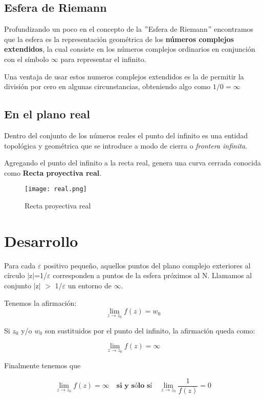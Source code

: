 \documentclass[12p]{article}
\begin{document}
\subsection{Esfera de Riemann}
Profundizando un poco en el concepto de la $"$Esfera de Riemann$"$ encontramos que la esfera es la representación geométrica de los \textbf{números complejos extendidos}, la cual consiste en los números complejos ordinarios en conjunción con el símbolo $\infty$ para representar el infinito.

Una ventaja de usar estos numeros complejos extendidos es la de permitir la división por cero en algunas circunstancias, obteniendo algo como $1/0=\infty$

\subsection{En el plano real}
Dentro del conjunto de los números reales el punto del infinito es una entidad topológica y geométrica que se introduce a modo de cierra o \textit{frontera infinita}.

Agregando el punto del infinito a la recta real, genera una curva cerrada conocida como \textbf{Recta proyectiva real}.

\begin{figure}[h]
\begin{center}
\texttt{[image: real.png]}\\
\caption{Recta proyectiva real}
\label{fig:figura2}
\end{center}
\end{figure}

\section{Desarrollo}
Para cada $\varepsilon$ positivo pequeño, aquellos puntos del plano complejo exteriores al círculo $|$z$|$=1/$\varepsilon$ corresponden a puntos de la esfera próximos al N. Llamamos al conjunto $|$z$|$ $>$ 1/$\varepsilon$ un entorno de $\infty$.

Tenemos la afirmación:
\[
\lim_{z\rightarrow z_0}f(z)=w_0
\]

Si $z_0$ y/o $w_0$ son sustituidos por el punto del infinito, la afirmación queda como:

\[
\lim_{z\rightarrow z_0}f(z)=\infty
\]



Finalmente tenemos que

\[\lim_{z\rightarrow z_0}f(z)=\infty \quad \textbf{si y sólo sí} \quad \lim_{z\rightarrow z_0}\frac{1}{f(z)}=0
\]
\end{document}
